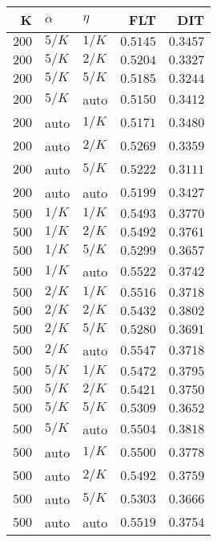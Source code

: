 \begin{table}
\begin{spacing}{1.2}
{\begin{tabular}{rll|rr}
\bottomrule
\end{tabular}
} \hfill \parbox{.45\linewidth}{\centering \begin{tabular}{rll|rr}
\toprule
    K &  $\alpha$ &    $\eta$ &           FLT &           DIT \\
\midrule
$200$ &  $5/K$ &  $1/K$ &      $0.5145$ &      $0.3457$ \\
$200$ &  $5/K$ &  $2/K$ &      $0.5204$ &      $0.3327$ \\
$200$ &  $5/K$ &  $5/K$ &      $0.5185$ &      $0.3244$ \\
$200$ &  $5/K$ &   auto &      $0.5150$ &      $0.3412$ \\
$200$ &   auto &  $1/K$ &      $0.5171$ &      $0.3480$ \\
$200$ &   auto &  $2/K$ &      $0.5269$ &      $0.3359$ \\
$200$ &   auto &  $5/K$ &      $0.5222$ &      $0.3111$ \\
$200$ &   auto &   auto &      $0.5199$ &      $0.3427$ \\
\myrowcolor $500$ &  $1/K$ &  $1/K$ &      $0.5493$ &      $0.3770$ \\
$500$ &  $1/K$ &  $2/K$ &      $0.5492$ &      $0.3761$ \\
$500$ &  $1/K$ &  $5/K$ &      $0.5299$ &      $0.3657$ \\
$500$ &  $1/K$ &   auto &      $0.5522$ &      $0.3742$ \\
$500$ &  $2/K$ &  $1/K$ &      $0.5516$ &      $0.3718$ \\
$500$ &  $2/K$ &  $2/K$ &      $0.5432$ &      $0.3802$ \\
$500$ &  $2/K$ &  $5/K$ &      $0.5280$ &      $0.3691$ \\
$500$ &  $2/K$ &   auto & $\bm{0.5547}$ &      $0.3718$ \\
$500$ &  $5/K$ &  $1/K$ &      $0.5472$ &      $0.3795$ \\
$500$ &  $5/K$ &  $2/K$ &      $0.5421$ &      $0.3750$ \\
$500$ &  $5/K$ &  $5/K$ &      $0.5309$ &      $0.3652$ \\
$500$ &  $5/K$ &   auto &      $0.5504$ & $\bm{0.3818}$ \\
$500$ &   auto &  $1/K$ &      $0.5500$ &      $0.3778$ \\
$500$ &   auto &  $2/K$ &      $0.5492$ &      $0.3759$ \\
$500$ &   auto &  $5/K$ &      $0.5303$ &      $0.3666$ \\
$500$ &   auto &   auto &      $0.5519$ &      $0.3754$ \\
\bottomrule
\end{tabular}
}
\end{spacing}
\end{table}
